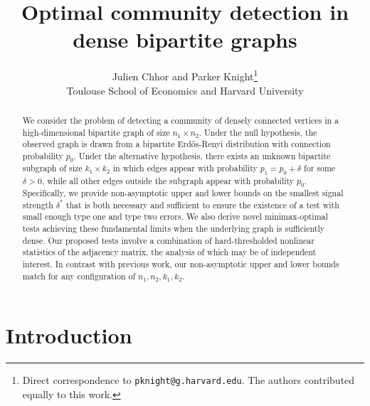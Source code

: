 \documentclass{article}
\title{Optimal community detection in dense bipartite graphs}
\author{%
  Julien Chhor and Parker Knight\footnote{Direct correspondence to \texttt{pknight@g.harvard.edu}. The authors contributed equally to this work.} \\
  Toulouse School of Economics and Harvard University
}
\begin{document}
\maketitle


\begin{abstract}
  We consider the problem of detecting a community of densely connected vertices in a high-dimensional bipartite graph of size $n_1 \times n_2$.
  Under the null hypothesis, the observed graph is drawn from a bipartite Erd\H{o}s-Renyi distribution with connection probability $p_0$. 
  Under the alternative hypothesis, there exists an unknown bipartite subgraph of size $k_1 \times k_2$ in which edges appear with probability $p_1 = p_0 + \delta$ for some $\delta > 0$, while all other edges outside the subgraph appear with probability $p_0$. 
  Specifically, we provide non-asymptotic upper and lower bounds on the smallest signal strength $\delta^*$ that is both necessary and sufficient to ensure the existence of a test with small enough type one and type two errors. 
  We also derive novel minimax-optimal tests achieving these fundamental limits when the underlying graph is sufficiently dense. 
  Our proposed tests involve a combination of hard-thresholded nonlinear statistics of the adjacency matrix, the analysis of which may be of independent interest.
  In contrast with previous work, our non-asymptotic upper and lower bounds match for any configuration of $n_1,n_2, k_1,k_2$. 
  
\end{abstract}


\section{Introduction}\label{sec:intro}
\end{document}
